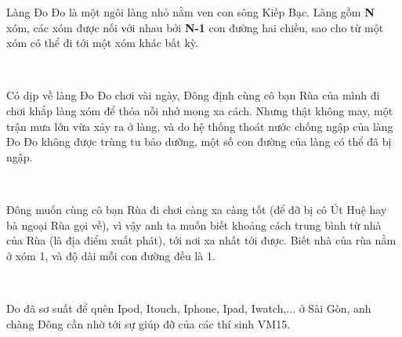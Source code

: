 Làng Đo Đo là một ngôi làng nhỏ nằm ven con sông Kiếp Bạc. Làng gồm\textbf{ N} xóm, các xóm được nối với nhau bởi\textbf{ N-1} con đường hai chiều, sao cho từ một xóm có thể đi tới một xóm khác bất kỳ.

 

Có dịp về làng Đo Đo chơi vài ngày, Đông định cùng cô bạn Rùa của mình đi chơi khắp làng xóm để thỏa nỗi nhớ mong xa cách. Nhưng thật không may, một trận mưa lớn vừa xảy ra ở làng, và do hệ thống thoát nước chống ngập của làng Đo Đo không được trùng tu bảo dưỡng, một số con đường của làng có thể đã bị ngập.

 

Đông muốn cùng cô bạn Rùa đi chơi càng xa càng tốt (để đỡ bị cô Út Huệ hay bà ngoại Rùa gọi về), vì vậy anh ta muốn biết khoảng cách trung bình từ nhà của Rùa (là địa điểm xuất phát), tới nơi xa nhất tới được. Biết nhà của rùa nằm ở xóm 1, và độ dài mỗi con đường đều là 1.

 

Do đã sơ suất để quên Ipod, Itouch, Iphone, Ipad, Iwatch,... ở Sài Gòn, anh chàng Đông cần nhờ tới sự giúp đỡ của các thí sinh VM15.
